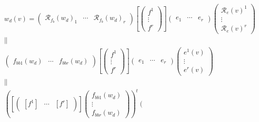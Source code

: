 \documentclass[aps,preprint]{revtex4}
\begin{document}
\begin{gather}
w_{d}\left( v\right) =\left( 
\begin{array}{ccc}
\mathcal{R}_{f_{b}}\left( w_{d}\right) _{1} & \cdots & \mathcal{R}%
_{f_{b}}\left( w_{d}\right) _{r}%
\end{array}%
\right) \left[ \left( 
\begin{array}{c}
f^{1} \\ 
\vdots \\ 
f^{r}%
\end{array}%
\right) \right] \left( 
\begin{array}{ccc}
e_{1} & \cdots & e_{r}%
\end{array}%
\right) \left( 
\begin{array}{c}
\mathcal{R}_{e}\left( v\right) ^{1} \\ 
\vdots \\ 
\mathcal{R}_{e}\left( v\right) ^{r}%
\end{array}%
\right) \\
\parallel \\
\left( 
\begin{array}{ccc}
f_{bb1}\left( w_{d}\right) & \cdots & f_{bbr}\left( w_{d}\right)%
\end{array}%
\right) \left[ \left( 
\begin{array}{c}
f^{1} \\ 
\vdots \\ 
f^{r}%
\end{array}%
\right) \right] \left( 
\begin{array}{ccc}
e_{1} & \cdots & e_{r}%
\end{array}%
\right) \left( 
\begin{array}{c}
e^{1}\left( v\right) \\ 
\vdots \\ 
e^{r}\left( v\right)%
\end{array}%
\right) \\
\parallel \\
\left( \left[ \left( 
\begin{array}{ccc}
\left[ f^{1}\right] & \cdots & \left[ f^{r}\right]%
\end{array}%
\right) \right] \left( 
\begin{array}{c}
f_{bb1}\left( w_{d}\right) \\ 
\vdots \\ 
f_{bbr}\left( w_{d}\right)%
\end{array}%
\right) \right) ^{t}\left( 
\begin{array}{ccc}

\end{array}
\end{gather}
\end{document}
